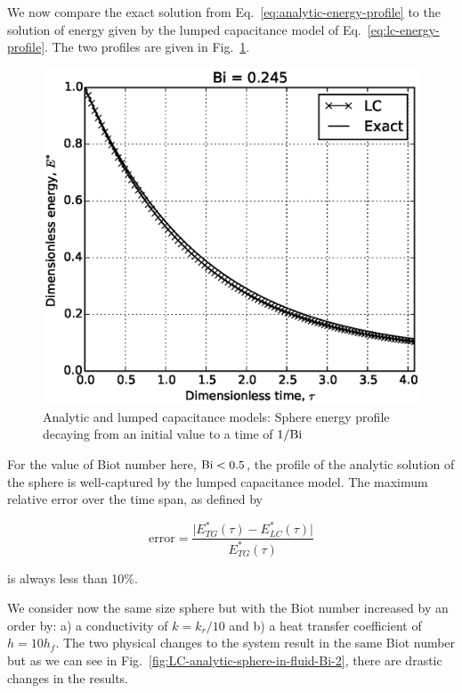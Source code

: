 We now compare the exact solution from Eq.~\ref{eq:analytic-energy-profile} to the solution of energy given by the lumped capacitance model of Eq.~\ref{eq:lc-energy-profile}. The two profiles are given in Fig.~\ref{fig:LC-analytic-sphere-in-fluid}. 

\begin{figure}[ht]
	\centering
		\includegraphics[width=\singleimagewidth]{chapters/figures/LC-analytic-sphere-in-fluid}
	\caption[Analytic temperature profile for $\Bi < 1$]{Analytic and lumped capacitance models: Sphere energy profile decaying from an initial value to a time of $1/\mathrm{Bi}$}
	\label{fig:LC-analytic-sphere-in-fluid}
\end{figure}

For the value of Biot number here, $\mathrm{Bi} < 0.5$, the profile of the analytic solution of the sphere is well-captured by the lumped capacitance model. The maximum relative error over the time span, as defined by

\begin{equation}\label{eq:error}
	\text{error} = \frac{\big|E^*_{TG}(\tau) - E^*_{LC}(\tau) \big|}{E^*_{TG}(\tau)}
\end{equation}

is always less than 10\%. 

We consider now the same size sphere but with the Biot number increased by an order by: a) a conductivity of $k = k_r/10$ and b) a heat transfer coefficient of $h = 10h_f$. The two physical changes to the system result in the same Biot number but as we can see in Fig.~\ref{fig:LC-analytic-sphere-in-fluid-Bi-2}, there are drastic changes in the results. 


